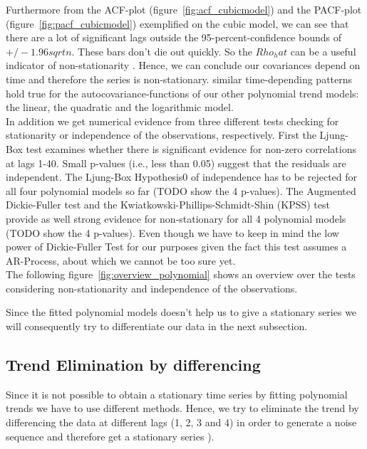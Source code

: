 \documentclass[11pt,a4paper]{article}
\begin{document}
Furthermore from the ACF-plot (figure~\ref{fig:acf_cubicmodel}) and the PACF-plot (figure~\ref{fig:pacf_cubicmodel}) exemplified on the cubic model, we can see that there are a lot of significant lags outside the 95-percent-confidence bounds of $+/-1.96sqrt{n}$.  These bars don't die out quickly. So the $Rho_hat$ can be a useful indicator of non-stationarity \cite[p.~21]{bd02}. Hence, we can conclude our covariances depend on time and therefore the series is non-stationary. similar time-depending patterns hold true for the autocovariance-functions of our other polynomial trend models: the linear, the quadratic and the logarithmic model. 
\\In addition we get numerical evidence from three different tests checking for stationarity or independence of the observations, respectively. First the Ljung-Box test examines whether there is significant evidence for non-zero correlations at lags 1-40. Small p-values (i.e., less than 0.05) suggest that the residuals are independent. The Ljung-Box Hypothesis0 of independence has to be rejected for all four polynomial models so far (TODO show the 4 p-values). The Augmented Dickie-Fuller test and the Kwiatkowski-Phillips-Schmidt-Shin (KPSS) test provide as well strong evidence for non-stationary for all 4 polynomial models (TODO show the 4 p-values). Even though we have to keep in mind the low power of Dickie-Fuller Test for our purposes given the fact this test assumes a AR-Process, about which we cannot be too sure  yet. 
\\ The following figure~\ref{fig:overview_polynomial} shows an overview over the tests considering non-stationarity and independence of the observations.

Since the fitted polynomial models doesn't help us to give a stationary series we will consequently try to differentiate our data in the next subsection.

\subsection{Trend Elimination by differencing}

Since it is not possible to obtain a stationary time series by fitting polynomial trends we have to use different methods. Hence, we try to eliminate the trend by differencing the data at different lags (1, 2, 3 and 4) in order to generate a noise sequence and therefore get a stationary series \cite[p.~35]{bd02}). 
\end{document}
